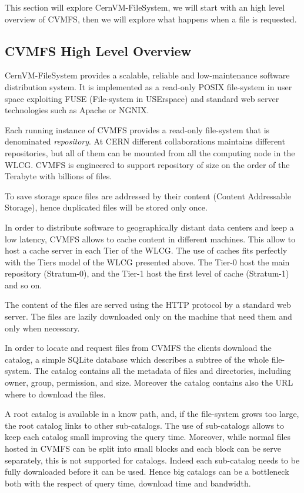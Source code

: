 This section will explore CernVM-FileSystem, we will start with an high level
overview of CVMFS, then we will explore what happens when a file is requested.

\subsection{CVMFS High Level Overview}

CernVM-FileSystem \cite{cvmfs} provides a scalable, reliable and
low-maintenance software distribution system. It is implemented as a read-only
POSIX file-system in user space exploiting FUSE (File-system in USErspace)
\cite{fuse} and standard web server technologies such as Apache or NGNIX.

Each running instance of CVMFS provides a read-only file-system that is
denominated \textit{repository}. At CERN different collaborations maintains
different repositories, but all of them can be mounted from all the computing
node in the WLCG. CVMFS is engineered to support repository of size on the
order of the Terabyte with billions of files.

To save storage space files are addressed by their content (Content Addressable
Storage), hence duplicated files will be stored only once.

In order to distribute software to geographically distant data centers and keep
a low latency, CVMFS allows to cache content in different machines. This allow
to host a cache server in each Tier of the WLCG. The use of caches fits
perfectly with the Tiers model of the WLCG presented above. The Tier-0 host
the main repository (Stratum-0), and the Tier-1 host the first level of cache
(Stratum-1) and so on.

The content of the files are served using the HTTP protocol by a standard
web server. The files are lazily downloaded only on the machine that need them
and only when necessary.

In order to locate and request files from CVMFS the clients download the
catalog, a simple SQLite database which describes a subtree of the whole
file-system.  The catalog contains all the metadata of files and directories,
including owner, group, permission, and size. Moreover the catalog contains
also the URL where to download the files.

A root catalog is available in a know path, and, if the file-system grows too
large, the root catalog links to other sub-catalogs. The use of sub-catalogs
allows to keep each catalog small improving the query time. Moreover, while
normal files hosted in CVMFS can be split into small blocks and each block can
be serve separately, this is not supported for catalogs. Indeed each
sub-catalog needs to be fully downloaded before it can be used. Hence big
catalogs can be a bottleneck both with the respect of query time, download time
and bandwidth.

